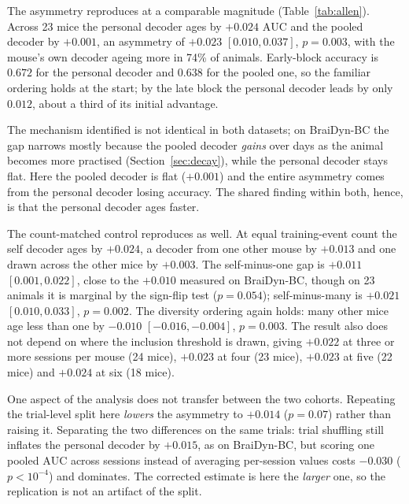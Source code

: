 \documentclass{article}
\newcommand{\auc}{\mathrm{AUC}}
\begin{document}
The asymmetry reproduces at a comparable magnitude (Table~\ref{tab:allen}). Across 23 mice the
personal decoder ages by $+0.024$ $\auc$ and the pooled decoder by $+0.001$, an asymmetry of
$+0.023$ $[0.010, 0.037]$, $p = 0.003$, with the mouse's own decoder ageing more in 74\% of animals.
Early-block accuracy is $0.672$ for the personal decoder and $0.638$ for the pooled one, so the
familiar ordering holds at the start; by the late block the personal decoder leads by only $0.012$,
about a third of its initial advantage.

The mechanism identified is not identical in both datasets; on BraiDyn-BC the gap narrows
mostly because the pooled decoder \emph{gains} over days as the animal becomes more practised
(Section~\ref{sec:decay}), while the personal decoder stays flat. Here the pooled decoder is flat
($+0.001$) and the entire asymmetry comes from the personal decoder losing accuracy. The shared
finding within both, hence, is that the personal decoder ages faster.

The count-matched control reproduces as well. At equal training-event count the self decoder ages
by $+0.024$, a decoder from one other mouse by $+0.013$ and one drawn across the other mice by
$+0.003$. The self-minus-one gap is $+0.011$ $[0.001, 0.022]$, close to the $+0.010$ measured on
BraiDyn-BC, though on 23 animals it is marginal by the sign-flip test ($p = 0.054$); self-minus-many
is $+0.021$ $[0.010, 0.033]$, $p = 0.002$. The diversity ordering again holds: many other mice age
less than one by $-0.010$ $[-0.016, -0.004]$, $p = 0.003$.
The result also does not depend on where the inclusion threshold is drawn, giving $+0.022$ at three
or more sessions per mouse (24 mice), $+0.023$ at four (23 mice), $+0.023$ at five (22 mice) and
$+0.024$ at six (18 mice).

One aspect of the analysis does not transfer between the two cohorts. Repeating the trial-level
split here \emph{lowers} the asymmetry to
$+0.014$ ($p = 0.07$) rather than raising it. Separating the two differences on the same trials:
trial shuffling still inflates the personal decoder by $+0.015$, as on BraiDyn-BC, but scoring one
pooled $\auc$ across sessions instead of averaging per-session values costs $-0.030$
($p < 10^{-4}$) and dominates. The corrected estimate is here the \emph{larger} one, so the
replication is not an artifact of the split.
\end{document}
